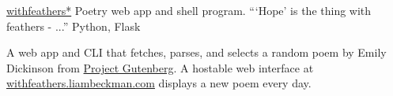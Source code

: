 \showoff
{\textcolor{my-blue}{\href{https://withfeathers.liambeckman.com}{withfeathers*}}}
{Poetry web app and shell program. ```Hope' is the thing with feathers - ...''}
{Python, Flask}
{}

A web app and CLI that fetches, parses, and selects a random poem by Emily Dickinson from \textcolor{my-blue}{\href{https://www.gutenberg.org/ebooks/12242}{Project Gutenberg}}. A hostable web interface at \textcolor{my-blue}{\href{https://withfeathers.liambeckman.com}{withfeathers.liambeckman.com}} displays a new poem every day.

